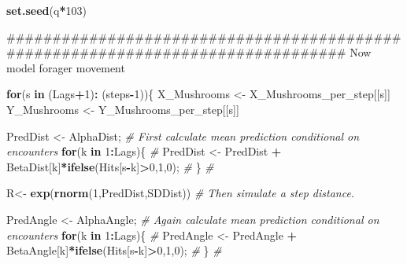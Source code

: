 \documentclass[]{article}
\newenvironment{Shaded}{\begin{snugshade}}{\end{snugshade}}
\newcommand{\KeywordTok}[1]{\textcolor[rgb]{0.13,0.29,0.53}{\textbf{#1}}}
\newcommand{\DecValTok}[1]{\textcolor[rgb]{0.00,0.00,0.81}{#1}}
\newcommand{\StringTok}[1]{\textcolor[rgb]{0.31,0.60,0.02}{#1}}
\newcommand{\CommentTok}[1]{\textcolor[rgb]{0.56,0.35,0.01}{\textit{#1}}}
\newcommand{\ControlFlowTok}[1]{\textcolor[rgb]{0.13,0.29,0.53}{\textbf{#1}}}
\newcommand{\OperatorTok}[1]{\textcolor[rgb]{0.81,0.36,0.00}{\textbf{#1}}}
\newcommand{\NormalTok}[1]{#1}
\begin{document}
\begin{Shaded}
\begin{Highlighting}[]
\KeywordTok{set.seed}\NormalTok{(q}\OperatorTok{*}\DecValTok{103}\NormalTok{)}

\NormalTok{################################################################################ Now model forager movement}

\ControlFlowTok{for}\NormalTok{(s }\ControlFlowTok{in}\NormalTok{ (Lags}\OperatorTok{+}\DecValTok{1}\NormalTok{)}\OperatorTok{:}\StringTok{ }\NormalTok{(steps}\OperatorTok{-}\DecValTok{1}\NormalTok{))\{                                                  }
\NormalTok{ X_Mushrooms <-}\StringTok{ }\NormalTok{X_Mushrooms_per_step[[s]]}
\NormalTok{ Y_Mushrooms <-}\StringTok{ }\NormalTok{Y_Mushrooms_per_step[[s]]}

\NormalTok{ PredDist <-}\StringTok{ }\NormalTok{AlphaDist;                                                         }\CommentTok{# First calculate mean prediction conditional on encounters}
\ControlFlowTok{for}\NormalTok{(k }\ControlFlowTok{in} \DecValTok{1}\OperatorTok{:}\NormalTok{Lags)\{                                                               }\CommentTok{#    }
\NormalTok{ PredDist <-}\StringTok{ }\NormalTok{PredDist }\OperatorTok{+}\StringTok{ }\NormalTok{BetaDist[k]}\OperatorTok{*}\KeywordTok{ifelse}\NormalTok{(Hits[s}\OperatorTok{-}\NormalTok{k]}\OperatorTok{>}\DecValTok{0}\NormalTok{,}\DecValTok{1}\NormalTok{,}\DecValTok{0}\NormalTok{);                                  }\CommentTok{#}
\NormalTok{       \}                                                                        }\CommentTok{#}

\NormalTok{ R<-}\StringTok{ }\KeywordTok{exp}\NormalTok{(}\KeywordTok{rnorm}\NormalTok{(}\DecValTok{1}\NormalTok{,PredDist,SDDist))                                              }\CommentTok{# Then simulate a step distance. }
    
\NormalTok{ PredAngle <-}\StringTok{ }\NormalTok{AlphaAngle;                                                       }\CommentTok{# Again calculate mean prediction conditional on encounters}
\ControlFlowTok{for}\NormalTok{(k }\ControlFlowTok{in} \DecValTok{1}\OperatorTok{:}\NormalTok{Lags)\{                                                               }\CommentTok{#    }
\NormalTok{ PredAngle <-}\StringTok{ }\NormalTok{PredAngle }\OperatorTok{+}\StringTok{ }\NormalTok{BetaAngle[k]}\OperatorTok{*}\KeywordTok{ifelse}\NormalTok{(Hits[s}\OperatorTok{-}\NormalTok{k]}\OperatorTok{>}\DecValTok{0}\NormalTok{,}\DecValTok{1}\NormalTok{,}\DecValTok{0}\NormalTok{);                              }\CommentTok{#}
\NormalTok{        \}                                                                       }\CommentTok{#}
                

\end{Highlighting}
\end{Shaded}
\end{document}
